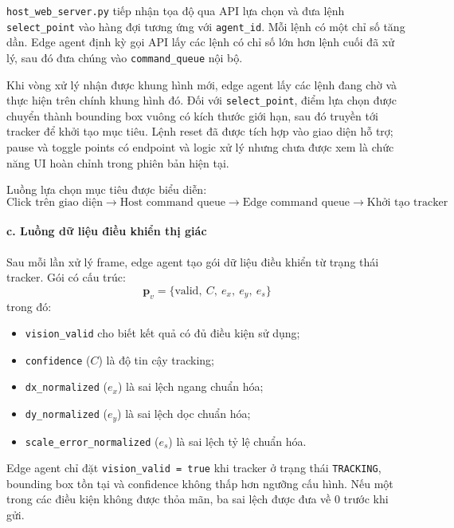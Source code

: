 \documentclass[../DoAn.tex]{subfiles}
\begin{document}
\texttt{host\_web\_server.py} tiếp nhận tọa độ qua API lựa chọn và đưa lệnh \texttt{select\_point} vào hàng đợi tương ứng với \texttt{agent\_id}. Mỗi lệnh có một chỉ số tăng dần. Edge agent định kỳ gọi API lấy các lệnh có chỉ số lớn hơn lệnh cuối đã xử lý, sau đó đưa chúng vào \texttt{command\_queue} nội bộ.

Khi vòng xử lý nhận được khung hình mới, edge agent lấy các lệnh đang chờ và thực hiện trên chính khung hình đó. Đối với \texttt{select\_point}, điểm lựa chọn được chuyển thành bounding box vuông có kích thước giới hạn, sau đó truyền tới tracker để khởi tạo mục tiêu. Lệnh reset đã được tích hợp vào giao diện hỗ trợ; pause và toggle points có endpoint và logic xử lý nhưng chưa được xem là chức năng UI hoàn chỉnh trong phiên bản hiện tại.

Luồng lựa chọn mục tiêu được biểu diễn:
\[
\text{Click trên giao diện} \longrightarrow \text{Host command queue} \longrightarrow \text{Edge command queue} \longrightarrow \text{Khởi tạo tracker}
\]


\paragraph{c. Luồng dữ liệu điều khiển thị giác}
Sau mỗi lần xử lý frame, edge agent tạo gói dữ liệu điều khiển từ trạng thái tracker. Gói có cấu trúc:
\[
\mathbf{p}_v = \big\{ \text{valid},\ C,\ e_x,\ e_y,\ e_s \big\}
\]
trong đó:
\begin{itemize}
    \item \texttt{vision\_valid} cho biết kết quả có đủ điều kiện sử dụng;
    \item \texttt{confidence} ($C$) là độ tin cậy tracking;
    \item \texttt{dx\_normalized} ($e_x$) là sai lệch ngang chuẩn hóa;
    \item \texttt{dy\_normalized} ($e_y$) là sai lệch dọc chuẩn hóa;
    \item \texttt{scale\_error\_normalized} ($e_s$) là sai lệch tỷ lệ chuẩn hóa.
\end{itemize}

Edge agent chỉ đặt \texttt{vision\_valid = true} khi tracker ở trạng thái \texttt{TRACKING}, bounding box tồn tại và confidence không thấp hơn ngưỡng cấu hình. Nếu một trong các điều kiện không được thỏa mãn, ba sai lệch được đưa về 0 trước khi gửi.
\end{document}
